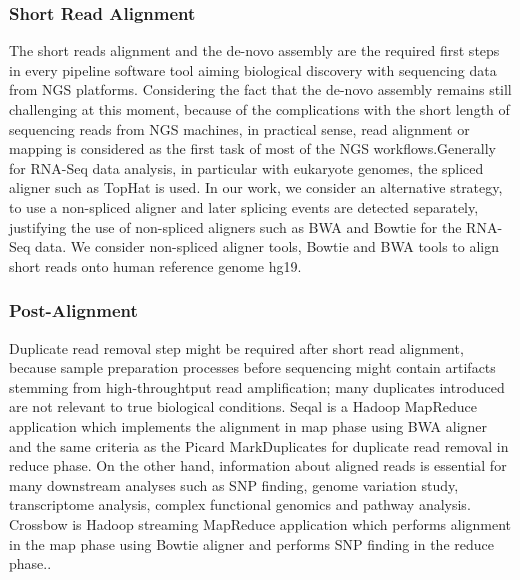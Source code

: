 \documentclass{acm_proc_article-sp}
\begin{document}
\subsubsection{Short Read Alignment}
The short reads alignment and the de-novo assembly are the required first steps in every pipeline software tool aiming biological discovery with sequencing data from NGS platforms.  Considering the fact that the de-novo assembly remains still challenging at this moment, because of the complications with the short length of sequencing reads from NGS machines, in practical sense,  read alignment or mapping is considered as the first task of most of the NGS workflows.Generally for RNA-Seq data analysis, in particular with eukaryote genomes, the spliced aligner such as TopHat\cite{pepke2009} is used. In our work, we consider an alternative strategy, to use a non-spliced aligner and later splicing events are detected separately, justifying the use of non-spliced aligners such as BWA and Bowtie for the RNA-Seq data. We consider non-spliced aligner tools, Bowtie and BWA tools to align short reads onto human reference genome hg19.

\subsubsection{Post-Alignment}
Duplicate read removal step might be required  after short read alignment, because sample preparation processes before sequencing might contain artifacts stemming from high-throughtput read amplification; many duplicates introduced are not relevant to true biological conditions. Seqal is a Hadoop MapReduce application which implements the alignment in map phase using BWA aligner and the same criteria as the Picard MarkDuplicates\cite{seal2011,seal_2011_mapred} for duplicate read removal in reduce phase.
On the other hand, information about aligned reads is essential for many downstream analyses such as SNP finding, genome variation study, transcriptome analysis, complex functional genomics and pathway analysis.
Crossbow is Hadoop streaming MapReduce application which performs alignment in the map phase using Bowtie aligner and  performs SNP finding in the reduce phase.\cite{langmead2009}. 

\end{document}
